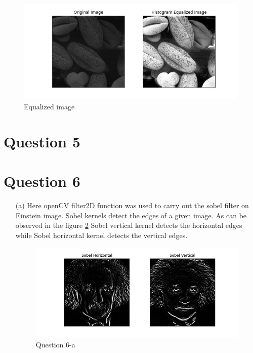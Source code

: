 \documentclass[11pt]{article}
\begin{document}
\begin{figure}[!h]
    \centering
    \includegraphics[width=\textwidth]{Images/41.jpg}
    \caption{Equalized image}
    \label{41}
\end{figure}

\section*{Question 5}

\section*{Question 6}

\begin{itemize}
    \item[(a)] Here openCV filter2D function was used to carry out the sobel filter on Einstein image. Sobel kernels detect the
            edges of a given image. As can be observed in the figure \ref{51} Sobel vertical kernel detects the horizontal edges while 
            Sobel horizontal kernel detects the vertical edges. 
    
    \begin{figure}[!h]
        \centering
        \includegraphics[width=\textwidth]{Images/51.jpg}
        \caption{Question 6-a}
        \label{51}
    \end{figure}
    
\end{itemize}
\end{document}
